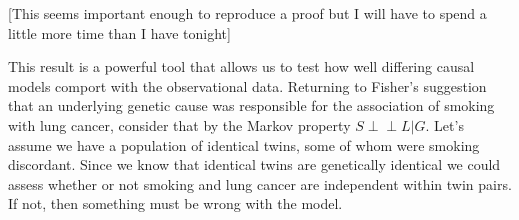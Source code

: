 \documentclass[12pt]{article}
\theoremstyle{definition}
\newcommand{\dsep}{\perp \!\!\!\perp}
\begin{document}
[This seems important enough to reproduce a proof but I will have to spend a little more time than I have tonight]

This result is a powerful tool that allows us to test how well differing causal models comport with the observational data.  Returning to Fisher's suggestion that an underlying genetic cause was responsible for the association of smoking with lung cancer, consider that by the Markov property $S \dsep L | G$. Let's assume we have a population of identical twins, some of whom were smoking discordant. Since we know that identical twins are genetically identical  we could assess whether or not smoking and lung cancer are independent within twin pairs. If not, then something must be wrong with the model. 
\end{document}
